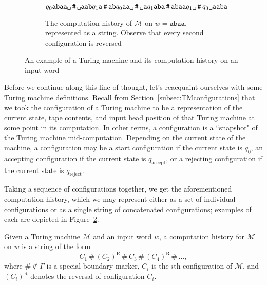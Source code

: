 \begin{figure}[t]
\begin{subfigure}[b]{0.9\textwidth}
\centering
\captionsetup{width=.9\linewidth}
\vspace{1.5em}
$q_{0}\texttt{abaa} \blankspace \, 
\texttt{\#} \, 
\blankspace \texttt{aab} q_{1} \texttt{a} \,
\texttt{\#} \, 
\texttt{ab} q_{0} \texttt{aa} \blankspace \, 
\texttt{\#} \, 
\blankspace \texttt{a} q_{1} \texttt{aba} \,
\texttt{\#} \, 
\texttt{abaa} q_{1} \blankspace \, 
\texttt{\#} \, 
q_{3} \blankspace \texttt{aaba}$
\vspace{0.5em}
\caption{The computation history of $\mathcal{M}$ on $w = \texttt{abaa}$, represented as a string. Observe that every second configuration is reversed}
\label{subfig:TMcomputationhistorystring}
\end{subfigure}
\caption{An example of a Turing machine and its computation history on an input word}
\label{fig:TMcomputationhistory}
\end{figure}

Before we continue along this line of thought, let's reacquaint ourselves with some Turing machine definitions. Recall from Section~\ref{subsec:TMconfigurations} that we took the configuration of a Turing machine to be a representation of the current state, tape contents, and input head position of that Turing machine at some point in its computation. In other terms, a configuration is a ``snapshot" of the Turing machine mid-computation. Depending on the current state of the machine, a configuration may be a start configuration if the current state is $q_{0}$, an accepting configuration if the current state is $q_{\text{accept}}$, or a rejecting configuration if the current state is $q_{\text{reject}}$.

Taking a sequence of configurations together, we get the aforementioned computation history, which we may represent either as a set of individual configurations or as a single string of concatenated configurations; examples of each are depicted in Figure~\ref{fig:TMcomputationhistory}.

\begin{definition}\label{def:computationhistory}
Given a Turing machine $\mathcal{M}$ and an input word $w$, a computation history for $\mathcal{M}$ on $w$ is a string of the form
\begin{equation*}
C_{1} \, \texttt{\#} \, (C_{2})^{\text{R}} \, \texttt{\#} \, C_{3} \, \texttt{\#} \, (C_{4})^{\text{R}} \, \texttt{\#} \, \dots,
\end{equation*}
where $\texttt{\#} \not\in \Gamma$ is a special boundary marker, $C_{i}$ is the $i$th configuration of $\mathcal{M}$, and $(C_{i})^{\text{R}}$ denotes the reversal of configuration $C_{i}$.
\end{definition}

